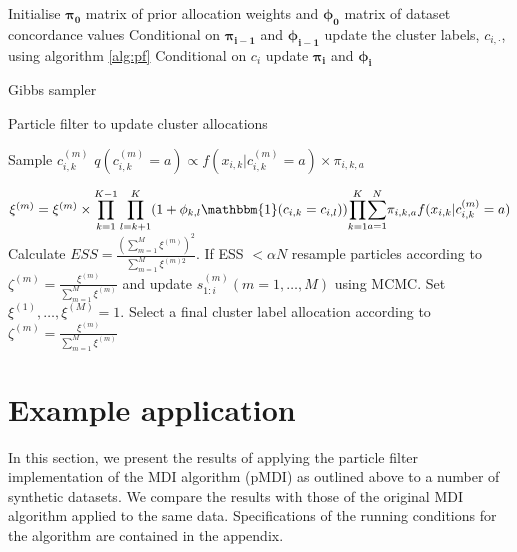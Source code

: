 \documentclass[10pt,a4paper]{article}
\begin{document}
\begin{algorithm}[H]
 \begin{algorithmic}[1]
  \State Initialise $\boldsymbol{\pi_0}$ matrix of prior allocation weights and $\boldsymbol{\phi_0}$ matrix of dataset concordance values
  \State Conditional on $\boldsymbol{\pi_{i - 1}}$ and $\boldsymbol{\phi_{i - 1}}$ update the cluster labels, $c_{i, \cdot}$, using algorithm \ref{alg:pf}
  \State Conditional on $c_{i}$ update $\boldsymbol{\pi_i}$ and $\boldsymbol{\phi_i}$
  \EndFor
\end{algorithmic}
\caption{Gibbs sampler}
\label{alg:gibbs}
\end{algorithm}


\begin{algorithm}[H]
\caption{Particle filter to update cluster allocations}
\label{alg:pf}
 \begin{algorithmic}[1]
  \State Sample $c^{(m)}_{i, k}$
  \State $q(c^{(m)}_{i,k} = a) \propto f(x_{i,k}|c_{i,k}^{(m)} = a) \times \pi_{i, k, a}$ 

  \EndFor
    \State $\xi^{(m)} = \xi^{(m)} \times {\displaystyle\prod_{k = 1}^{K - 1}\prod_{l = k + 1}^{K}} (1+\phi_{k,l} \mathbbm{1}(c_{i,k} = c_{i,l})) {\displaystyle\prod_{k = 1}^{K}} {\displaystyle \sum_{a = 1}^N}  \pi_{i, k, a} f(x_{i,k}|c_{i,k}^{(m)} = a)$
  \EndFor
  \State Calculate $ESS = \frac{(\sum_{m = 1}^{M}\xi^{(m)})^2}{\sum_{m = 1}^{M}\xi^{(m)2}}$.
  \State If ESS $< \alpha N$ resample particles according to $\zeta^{(m)} = \frac{\xi^{(m)}}{\sum_{m = 1}^{M}\xi^{(m)}}$ and update $s_{1:i}^{(m)} (m = 1,\dots,M)$ using MCMC. Set $\xi^{(1)}, \dots, \xi^{(M)} = 1.$
  \EndFor
  \State Select a final cluster label allocation according to $\zeta^{(m)} = \frac{\xi^{(m)}}{\sum_{m = 1}^{M}\xi^{(m)}}$

\end{algorithmic}
\end{algorithm}



\section{Example application}
\label{sec:application}
In this section, we present the results of applying the particle filter implementation of the MDI algorithm (pMDI) as outlined above to a number of synthetic datasets. We compare the results with those of the original MDI algorithm applied to the same data. Specifications of the running conditions for the algorithm are contained in the appendix.
\end{document}
